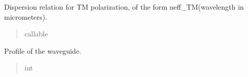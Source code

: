 \documentclass[a4paper,10pt,english]{sphinxmanual}
\begin{document}
\begin{fulllineitems}
\begin{fulllineitems}
\label{\detokenize{waveguide:pyjsa.waveguide.Waveguide.neff_TM}}
\pysigstartsignatures
{}
\pysigstopsignatures
\sphinxAtStartPar
Dispersion relation for TM polarization, of the form neff\_TM(wavelength in micrometers).
\begin{quote}\begin{description}
\sphinxAtStartPar
callable

\end{description}\end{quote}

\end{fulllineitems}


\begin{fulllineitems}
\label{\detokenize{waveguide:pyjsa.waveguide.Waveguide.profile}}
\pysigstartsignatures
{}
\pysigstopsignatures
\sphinxAtStartPar
Profile of the waveguide.
\begin{quote}\begin{description}
\sphinxAtStartPar
int

\end{description}\end{quote}

\end{fulllineitems}


\end{fulllineitems}

\end{document}

